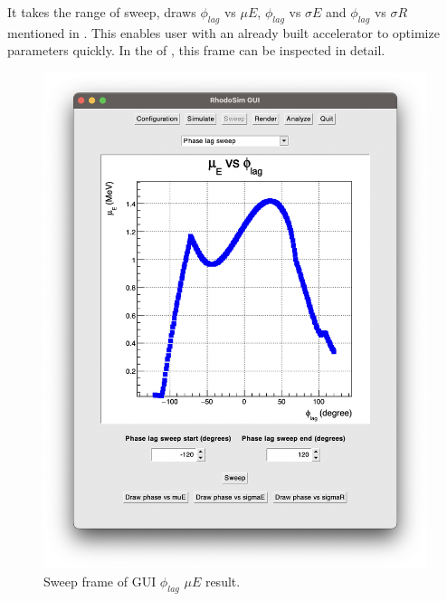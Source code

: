 \documentclass[a4paper,oneside,12pt]{report}
\numberwithin{equation}{chapter}
\begin{document}
{It takes the range of sweep, draws $\phi_{lag}$ vs $\mu E$, $\phi_{lag}$ vs $\sigma E$ and $\phi_{lag}$ vs $\sigma R$ mentioned in .
This enables user with an already built accelerator to optimize \egun parameters quickly. 
In the  of , this frame can be inspected in detail.
\vspace{10pt}
\begin{figure}[h]
    \centering
    \includegraphics[width=0.85\linewidth]{./figures/rhodoSim/GUI_sweep_muE_3.png}
    \caption{Sweep frame of GUI $\phi_{lag}$ $\mu E$ result.}
    \label{fig:gui_sweep_muE}
\end{figure}
\clearpage
\begin{figure}[h]
    \centering

\end{figure}}
\end{document}

